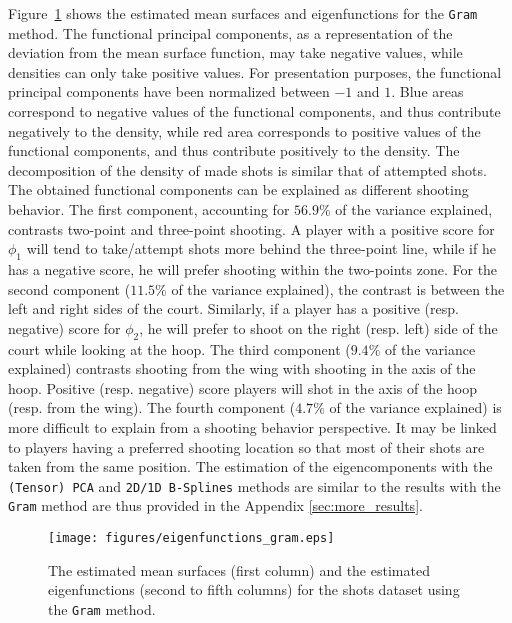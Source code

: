 Figure~\ref{fig:eigenfunctions_gram} shows the estimated mean surfaces and eigenfunctions for the \texttt{Gram} method. The functional principal components, as a representation of the deviation from the mean surface function, may take negative values, while densities can only take positive values. For presentation purposes, the functional principal components have been normalized between $-1$ and $1$. Blue areas correspond to negative values of the functional components, and thus contribute negatively to the density, while red area corresponds to positive values of the functional components, and thus contribute positively to the density. The decomposition of the density of made shots is similar that of attempted shots. The obtained functional components can be explained as different shooting behavior. The first component, accounting for $56.9\%$ of the variance explained, contrasts two-point and three-point shooting. A player with a positive score for $\phi_1$ will tend to take/attempt shots more behind the three-point line, while if he has a negative score, he will prefer shooting within the two-points zone. For the second component ($11.5\%$ of the variance explained), the contrast is between the left and right sides of the court. Similarly, if a player has a positive (resp. negative) score for $\phi_2$, he will prefer to shoot on the right (resp. left) side of the court while looking at the hoop. The third component ($9.4\%$ of the variance explained) contrasts shooting from the wing with shooting in the axis of the hoop. Positive (resp. negative) score players will shot in the axis of the hoop (resp. from the wing). The fourth component ($4.7\%$ of the variance explained) is more difficult to explain from a shooting behavior perspective. It may be linked to players having a preferred shooting location so that most of their shots are taken from the same position. The estimation of the eigencomponents with the \texttt{(Tensor) PCA} and \texttt{2D/1D B-Splines} methods are similar to the results with the \texttt{Gram} method are thus provided in the Appendix \ref{sec:more_results}.
\begin{figure}
    \centering
    \texttt{[image: figures/eigenfunctions\_gram.eps]}
    \caption{The estimated mean surfaces (first column) and the estimated eigenfunctions (second to fifth columns) for the shots dataset using the \texttt{Gram} method.}
    \label{fig:eigenfunctions_gram}
\end{figure}
